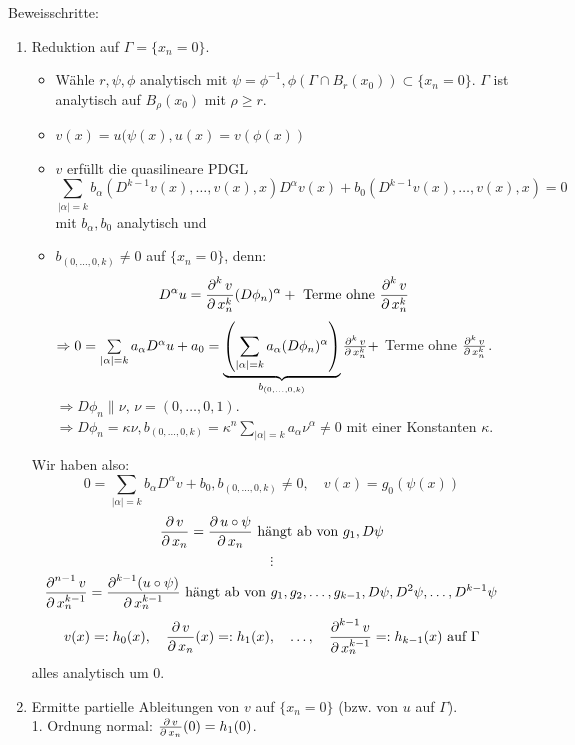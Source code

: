 	Beweisschritte: \begin{enumerate}[(1)]
		\item Reduktion auf $\Gamma = \{ x_n = 0 \}$. \begin{itemize}
			\item Wähle $r, \psi, \phi$ analytisch mit $\psi = \phi^{-1}, \phi(\Gamma \cap B_r(x_0)) \subset \{x_n = 0 \}$. $\Gamma$ ist analytisch auf $B_\rho(x_0)$ mit $\rho \geq r$.
			\item $v(x) = u (\psi (x), u(x) = v (\phi(x))$
			\item $v$ erfüllt die quasilineare PDGL
			\begin{equation}
			 \sum\limits_{|\alpha| = k} b_\alpha(D^{k-1} v(x),\dots,v(x),x) D^\alpha v(x) + b_0(D^{k-1}v(x),\dots,v(x),x)=0 \tag{$*$} \end{equation}
			mit $b_\alpha, b_0$ analytisch und
			\item $b_{(0,\dots,0,k)} \neq 0$ auf $\{x_n = 0\}$, denn:	 
			\[ D^\alpha u = \frac{\der^k v}{\der x_n^k} (D\phi_n)^\alpha + \text{ Terme ohne } \frac{\der^k v}{\der x_n^k} \]
			$\Rightarrow 0 = \sum\limits_{|\alpha|=k} a_\alpha D^\alpha u + a_0 = \underbrace{\enbrace*{ \sum\limits_{|\alpha| = k} a_\alpha (D \phi_n)^\alpha }}_{b_{(0,\dots,0,k)}} \frac{\der^k v}{\der x_n^k} + $ Terme ohne $\frac{\der^k v}{\der x_n^k}$. \\
			$\Rightarrow D\phi_n \parallel \nu$, $\nu = (0,\dots,0,1)$.  \\
			$\Rightarrow D\phi_n = \kappa \nu, b_{(0,\dots,0,k)} = \kappa^n \sum\limits_{|\alpha|=k} a_\alpha \nu^\alpha \neq 0$ mit einer Konstanten $\kappa$. \end{itemize}
			Wir haben also:
			\[ 0 = \sum\limits_{|\alpha|=k} b_\alpha D^\alpha v + b_0, b_{(0,\dots,0,k)} \neq 0, \quad v(x) = g_0(\psi(x))\]
			\[ \frac{\der v}{\der x_n} = \frac{\der u\circ \psi}{\der x_n} \text{ hängt ab von } g_1,D\psi \]
			\[ \vdots \] \[\frac{\der^{n-1} v}{\der x_n^{k-1}} = \frac{\der^{k-1}(u \circ \psi)}{\der x_n^{k-1}} \text{ hängt ab von } g_1, g_2,\dots,g_{k-1},D\psi,D^2\psi, \dots, D^{k-1} \psi\]
			\[ v(x) =: h_0(x),\quad \frac{\der v}{\der x_n} (x) =: h_1(x),\quad \dots ,\quad \frac{\der^{k-1} v}{\der x_n^{k-1}} =:  h_{k-1}(x) \text{ auf } \Gamma \]
					alles analytisch um 0.			
		\item Ermitte partielle Ableitungen von $v$ auf $\{x_n = 0\}$ (bzw. von $u$ auf $\Gamma$). \\
		1. Ordnung normal: $\frac{\der v}{\der x_n} (0) = h_1(0)$. \\

\end{enumerate}
